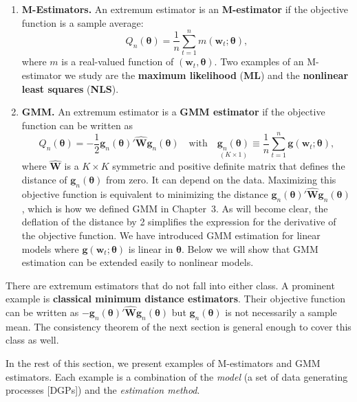 \begin{enumerate}
\item \textbf{M-Estimators.} An extremum estimator is an \textbf{M-estimator} if the objective function is a sample average:
\begin{equation}
\label{eq:7.1.2}
Q_n(\bm{\theta}) = \frac{1}{n} \sum_{t=1}^{n} m(\mathbf{w}_t; \bm{\theta}),
\end{equation}
where $m$ is a real-valued function of $(\mathbf{w}_t, \bm{\theta})$. Two examples of an M-estimator we study are the \textbf{maximum likelihood} (\textbf{ML}) and the \textbf{nonlinear least squares} (\textbf{NLS}).

\item \textbf{GMM.} An extremum estimator is a \textbf{GMM estimator} if the objective function can be written as
\begin{equation}
\label{eq:7.1.3}
Q_n(\bm{\theta}) = -\frac{1}{2} \mathbf{g}_n(\bm{\theta})' \widehat{\mathbf{W}} \mathbf{g}_n(\bm{\theta}) \quad \text{with} \quad \underset{(K \times 1)}{\mathbf{g}_n(\bm{\theta})} \equiv \frac{1}{n} \sum_{t=1}^{n} \mathbf{g}(\mathbf{w}_t; \bm{\theta}),
\end{equation}
where $\widehat{\mathbf{W}}$ is a $K \times K$ symmetric and positive definite matrix that defines the distance of $\mathbf{g}_n(\bm{\theta})$ from zero. It can depend on the data. Maximizing this objective function is equivalent to minimizing the distance $\mathbf{g}_n(\bm{\theta})' \widehat{\mathbf{W}} \mathbf{g}_n(\bm{\theta})$, which is how we defined GMM in Chapter~3. As will become clear, the deflation of the distance by 2 simplifies the expression for the derivative of the objective function. We have introduced GMM estimation for linear models where $\mathbf{g}(\mathbf{w}_t; \bm{\theta})$ is linear in $\bm{\theta}$. Below we will show that GMM estimation can be extended easily to nonlinear models.
\end{enumerate}

There are extremum estimators that do not fall into either class. A prominent example is \textbf{classical minimum distance estimators}. Their objective function can be written as $-\mathbf{g}_n(\bm{\theta})' \widehat{\mathbf{W}} \mathbf{g}_n(\bm{\theta})$ but $\mathbf{g}_n(\bm{\theta})$ is not necessarily a sample mean. The consistency theorem of the next section is general enough to cover this class as well.

In the rest of this section, we present examples of M-estimators and GMM estimators. Each example is a combination of the \emph{model} (a set of data generating processes [DGPs]) and the \emph{estimation method}.

